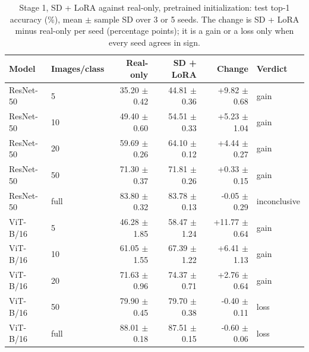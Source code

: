 \begin{table}[H]
\centering
\caption{Stage 1, SD + LoRA against real-only, pretrained initialization: test top-1 accuracy (\%), mean $\pm$ sample SD over 3 or 5 seeds. The change is SD + LoRA minus real-only per seed (percentage points); it is a gain or a loss only when every seed agrees in sign.}
\label{tab:stage1-pretrained-accuracy-sd_lora-test}
\begin{tabular}{llrrrl}
\toprule
Model & Images/class & Real-only & SD + LoRA & Change & Verdict \\
\midrule
ResNet-50 & 5 & 35.20 $\pm$ 0.42 & 44.81 $\pm$ 0.36 & +9.82 $\pm$ 0.68 & gain \\
ResNet-50 & 10 & 49.40 $\pm$ 0.60 & 54.51 $\pm$ 0.33 & +5.23 $\pm$ 1.04 & gain \\
ResNet-50 & 20 & 59.69 $\pm$ 0.26 & 64.10 $\pm$ 0.12 & +4.44 $\pm$ 0.27 & gain \\
ResNet-50 & 50 & 71.30 $\pm$ 0.37 & 71.81 $\pm$ 0.26 & +0.33 $\pm$ 0.15 & gain \\
ResNet-50 & full & 83.80 $\pm$ 0.32 & 83.78 $\pm$ 0.13 & -0.05 $\pm$ 0.29 & inconclusive \\
\midrule
ViT-B/16 & 5 & 46.28 $\pm$ 1.85 & 58.47 $\pm$ 1.24 & +11.77 $\pm$ 0.64 & gain \\
ViT-B/16 & 10 & 61.05 $\pm$ 1.55 & 67.39 $\pm$ 1.22 & +6.41 $\pm$ 1.13 & gain \\
ViT-B/16 & 20 & 71.63 $\pm$ 0.96 & 74.37 $\pm$ 0.71 & +2.76 $\pm$ 0.64 & gain \\
ViT-B/16 & 50 & 79.90 $\pm$ 0.45 & 79.70 $\pm$ 0.38 & -0.40 $\pm$ 0.11 & loss \\
ViT-B/16 & full & 88.01 $\pm$ 0.18 & 87.51 $\pm$ 0.15 & -0.60 $\pm$ 0.06 & loss \\
\bottomrule
\end{tabular}
\end{table}
